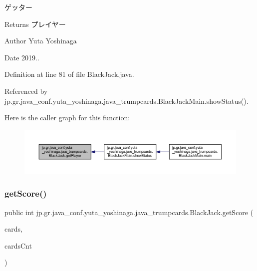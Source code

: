 ゲッター 

\begin{DoxyReturn}{Returns}
プレイヤー 
\end{DoxyReturn}
\begin{DoxyAuthor}{Author}
Yuta Yoshinaga 
\end{DoxyAuthor}
\begin{DoxyDate}{Date}
2019.. 
\end{DoxyDate}


Definition at line 81 of file Black\+Jack.\+java.



Referenced by jp.\+gr.\+java\+\_\+conf.\+yuta\+\_\+yoshinaga.\+java\+\_\+trumpcards.\+Black\+Jack\+Main.\+show\+Status().

Here is the caller graph for this function\+:
\nopagebreak
\begin{figure}[H]
\begin{center}
\leavevmode
\includegraphics[width=350pt]{classjp_1_1gr_1_1java__conf_1_1yuta__yoshinaga_1_1java__trumpcards_1_1_black_jack_aa4fff12d377006ce93d731a6808b67bd_icgraph}
\end{center}
\end{figure}
\mbox{\label{classjp_1_1gr_1_1java__conf_1_1yuta__yoshinaga_1_1java__trumpcards_1_1_black_jack_a23b680e89ca3a4c306576ba0a7debfac}} 
\subsubsection{\texorpdfstring{get\+Score()}{getScore()}}
{\footnotesize\ttfamily public int jp.\+gr.\+java\+\_\+conf.\+yuta\+\_\+yoshinaga.\+java\+\_\+trumpcards.\+Black\+Jack.\+get\+Score (\begin{DoxyParamCaption}\item[{Array\+List$<$ \hyperlink{classjp_1_1gr_1_1java__conf_1_1yuta__yoshinaga_1_1java__trumpcards_1_1_card}{Card} $>$}]{cards,  }\item[{int}]{cards\+Cnt }\end{DoxyParamCaption})}



